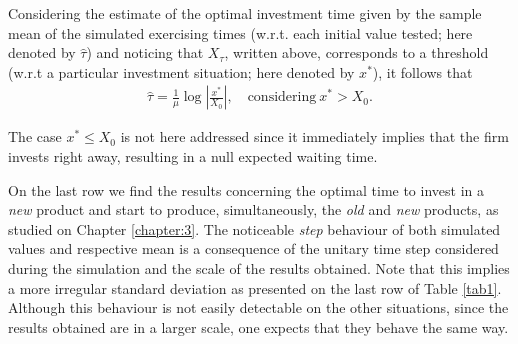 Considering the estimate of the optimal investment time given by the sample mean of the simulated exercising times (w.r.t. each initial value tested; here denoted by $\hat{\tau}$) and noticing that $X_\tau$, written above, corresponds to a threshold (w.r.t a particular investment situation; here denoted by $x^*$), it follows that
\begin{align}
 \hat{\tau}=\frac{1}{\mu} \log \left|  \frac{x^*}{X_0} \right|, \quad \text{considering} \ x^*> X_0.
\end{align}

The case $x^*\leq X_0$ is not here addressed since it immediately implies that the firm invests right away, resulting in a null expected waiting time.





On the last row we find the results concerning the optimal time to invest in a \textit{new} product and start to produce, simultaneously, the \textit{old} and \textit{new} products, as studied on Chapter \ref{chapter:3}.
The noticeable \textit{step} behaviour of both simulated values and respective mean is a consequence of the unitary time step considered during the simulation and the scale of the results obtained. Note that this implies a more irregular standard deviation as presented on the last row of Table \ref{tab1}.
Although this behaviour is not easily detectable on the other situations, since the results obtained are in a larger scale, one expects that they behave the same way.


